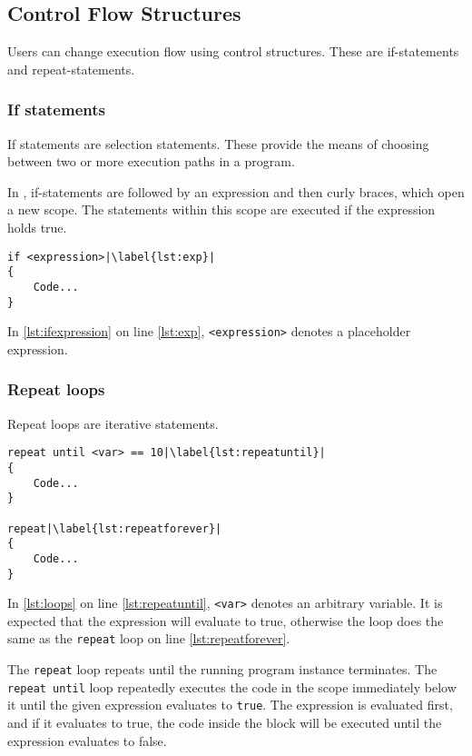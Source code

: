 \subsection{Control Flow Structures}
Users can change execution flow using control structures. These are if-statements and repeat-statements.
\subsubsection{If statements}
If statements are selection statements. These provide the means of choosing between two or more execution paths in a program\cite{sebesta_concepts_2016}.

In \dazel{}, if-statements are followed by an expression and then curly braces, which open a new scope. The statements within this scope are executed if the expression holds true.

\begin{lstlisting}[caption={Example of an if statement}, label={lst:ifexpression},escapechar=|]
if <expression>|\label{lst:exp}|
{
    Code...
}
\end{lstlisting}

In \ref{lst:ifexpression} on line \ref{lst:exp},  \verb|<expression>| denotes a placeholder expression.

\subsubsection{Repeat loops}
Repeat loops are iterative statements.

\begin{lstlisting}[caption={Example of loops}, label={lst:loops},escapechar=|]
repeat until <var> == 10|\label{lst:repeatuntil}|
{
    Code...
}

repeat|\label{lst:repeatforever}|
{
    Code...
}
\end{lstlisting}

In \ref{lst:loops} on line \ref{lst:repeatuntil}, \verb|<var>| denotes an arbitrary variable. It is expected that the expression will evaluate to true, otherwise the loop does the same as the \verb|repeat| loop on line \ref{lst:repeatforever}.

The \verb|repeat| loop repeats until the running program instance terminates.
The \verb|repeat until| loop repeatedly executes the code in the scope immediately below it until the given expression evaluates to \verb|true|.
The expression is evaluated first, and if it evaluates to true, the code inside the block will be executed until the expression evaluates to false.